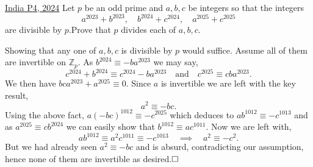 \begin{problem}{2}{\href{https://artofproblemsolving.com/community/c6h3239264p34615369}{India P4, 2024}}
		Let $p$ be an odd prime and $a,b,c$ be integers so that the integers$$a^{2023}+b^{2023},\quad b^{2024}+c^{2024},\quad a^{2025}+c^{2025}$$are divisible by $p$.Prove that $p$ divides each of $a,b,c$.
	\begin{solution} Showing that any one of $a,b,c$ is divisible by $p$ would suffice. Assume all of them are invertible on $\mathbb{Z}_p$. As $b^{2024}\equiv -ba^{2023}$ we may say,
$$c^{2024}+b^{2024}\equiv c^{2024}-ba^{2023}\quad\text{and}\quad c^{2025}\equiv cba^{2023}.$$We then have $bca^{2023}+a^{2025}\equiv 0$. Since $a$ is invertible we are left with the key result,
$$a^2\equiv -bc.$$Using the above fact, $a(-bc)^{1012}\equiv-c^{2025}$ which deduces to $ab^{1012}\equiv -c^{1013}$ and as $a^{2025}\equiv cb^{2024}$ we can easily show that $b^{1012}\equiv ac^{1011}$. Now we are left with,
$$ab^{1012}\equiv a^2c^{1011}\equiv -c^{1013}\quad\implies\quad a^2\equiv -c^2.$$But we had already seen $a^2\equiv -bc$ and is absurd, contradicting our assumption, hence none of them are invertible as desired.$\qedwhite$
	\end{solution}
\end{problem}


